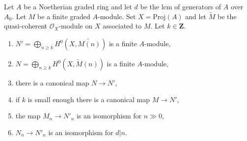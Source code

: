 %
\begin{lemma}
\label{lemma-recover-tail-graded-module-general}
Let $A$ be a Noetherian graded ring and let $d$ be the lcm of generators
of $A$ over $A_0$. Let $M$ be a finite graded $A$-module.
Set $X = \text{Proj}(A)$ and let $\widetilde{M}$ be
the quasi-coherent $\mathcal{O}_X$-module on $X$ associated to $M$.
Let $k \in \mathbf{Z}$.
\begin{enumerate}
\item $N' = \bigoplus_{n \geq k} H^0(X, \widetilde{M(n)})$
is a finite $A$-module,
\item $N = \bigoplus_{n \geq k} H^0(X, \widetilde{M}(n))$
is a finite $A$-module,
\item there is a canonical map $N \to N'$,
\item if $k$ is small enough there is a canonical map $M \to N'$,
\item the map $M_n \to N'_n$ is an isomorphism for $n \gg 0$,
\item $N_n \to N'_n$ is an isomorphism for $d | n$.
\end{enumerate}
\end{lemma}

